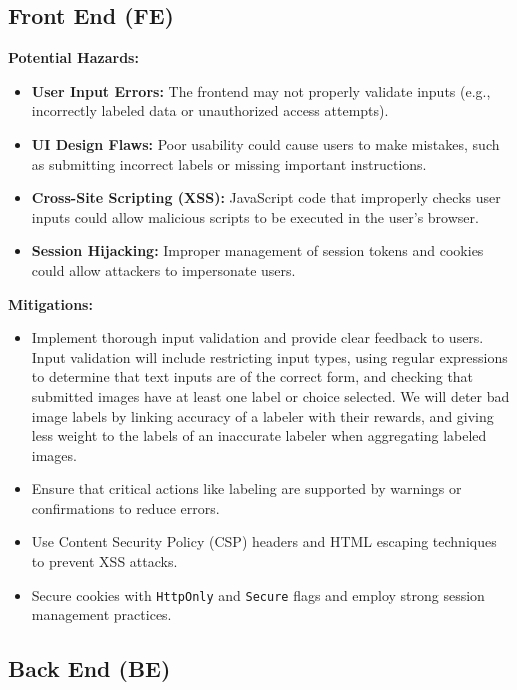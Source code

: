 \documentclass{article}
\begin{document}
\subsection{Front End (FE)}
\textbf{Potential Hazards:}
\begin{itemize}
    \item \textbf{User Input Errors:} The frontend may not properly validate inputs (e.g., incorrectly labeled data or unauthorized access attempts).
    \item \textbf{UI Design Flaws:} Poor usability could cause users to make mistakes, such as submitting incorrect labels or missing important instructions.
    \item \textbf{Cross-Site Scripting (XSS):} JavaScript code that improperly checks user inputs could allow malicious scripts to be executed in the user's browser.
    \item \textbf{Session Hijacking:} Improper management of session tokens and cookies could allow attackers to impersonate users.
\end{itemize}
\textbf{Mitigations:}
\begin{itemize}
    \item Implement thorough input validation and provide clear feedback to users. 
    Input validation will include restricting input types, using regular expressions to determine that text inputs are of the correct form, and checking that submitted images have at least one label or choice selected. 
    We will deter bad image labels by linking accuracy of a labeler with their rewards, and giving less weight to the labels of an inaccurate labeler when aggregating labeled images.
    \item Ensure that critical actions like labeling are supported by warnings or confirmations to reduce errors.
    \item Use Content Security Policy (CSP) headers and HTML escaping techniques to prevent XSS attacks.
    \item Secure cookies with \texttt{HttpOnly} and \texttt{Secure} flags and employ strong session management practices.
\end{itemize}

\subsection{Back End (BE)}
\end{document}
